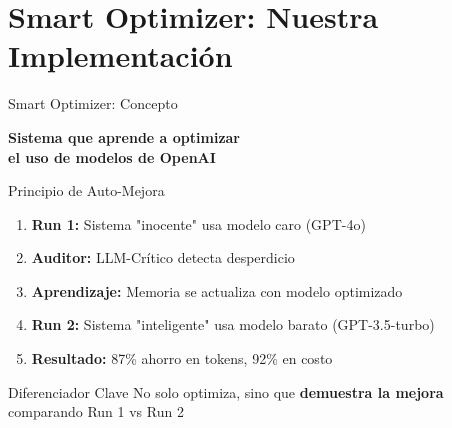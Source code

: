 \documentclass[aspectratio=169,11pt]{beamer}
\begin{document}
\section{Smart Optimizer: Nuestra Implementación}

\begin{frame}{Smart Optimizer: Concepto}
\begin{center}
\LARGE \textbf{Sistema que aprende a optimizar} \\
\LARGE \textbf{el uso de modelos de OpenAI}
\end{center}

\vspace{0.5cm}

\begin{exampleblock}{Principio de Auto-Mejora}
\begin{enumerate}
    \item \textbf{Run 1:} Sistema "inocente" usa modelo caro (GPT-4o)
    \item \textbf{Auditor:} LLM-Crítico detecta desperdicio
    \item \textbf{Aprendizaje:} Memoria se actualiza con modelo optimizado
    \item \textbf{Run 2:} Sistema "inteligente" usa modelo barato (GPT-3.5-turbo)
    \item \textbf{Resultado:} 87\% ahorro en tokens, 92\% en costo
\end{enumerate}
\end{exampleblock}

\vspace{0.3cm}

\begin{alertblock}{Diferenciador Clave}
No solo optimiza, sino que \textbf{demuestra la mejora} comparando Run 1 vs Run 2
\end{alertblock}
\end{frame}
\end{document}
